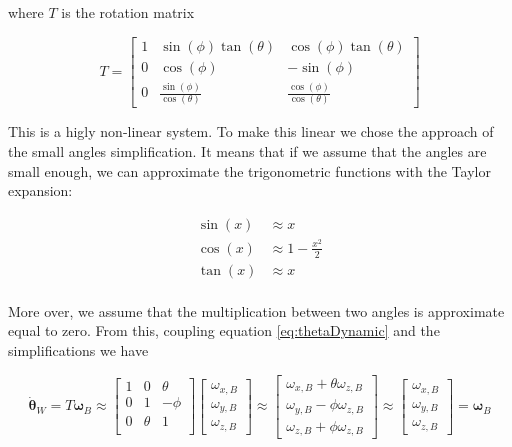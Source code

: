 \noindent where $T$ is the rotation matrix

\begin{equation}
	T = 
	\begin{bmatrix}
		1 & \sin(\phi)\tan(\theta)          & \cos(\phi)\tan(\theta) \\
		0 & \cos(\phi)                      & -\sin(\phi)            \\
		0 & \frac{\sin(\phi)}{\cos(\theta)} & \frac{\cos(\phi)}{\cos(\theta)} 
	\end{bmatrix}
\end{equation}

\noindent This is a higly non-linear system. To make this linear we chose the approach of the small angles simplification. It means that if we assume that the angles are small enough, we can approximate the trigonometric functions with the Taylor expansion:

\begin{align*}
	\sin(x) &\approx x \\
	\cos(x) &\approx 1-\frac{x^2}{2} \\
	\tan(x) &\approx x \\
\end{align*}

\noindent More over, we assume that the multiplication between two angles is approximate equal to zero. From this, coupling equation \eqref{eq:thetaDynamic} and the simplifications we have

\begin{equation}
	\dot{\boldsymbol{\theta}}_W = T\boldsymbol{\omega}_B \approx 
	\begin{bmatrix}
		1 & 0      & \theta \\
		0 & 1      & -\phi  \\
		0 & \theta & 1 \\ 
	\end{bmatrix}
	\begin{bmatrix}
		\omega_{x,B} \\
		\omega_{y,B} \\
		\omega_{z,B}
	\end{bmatrix} \approx 
	\begin{bmatrix}
		\omega_{x,B}+\theta\omega_{z,B} \\
		\omega_{y,B}-\phi\omega_{z,B}   \\
		\omega_{z,B}+\phi\omega_{z,B}
	\end{bmatrix} \approx
	\begin{bmatrix}
		\omega_{x,B} \\
		\omega_{y,B} \\
		\omega_{z,B}
	\end{bmatrix}
	= \boldsymbol{\omega}_B
	\label{eq:MPCdyn4}
\end{equation}

